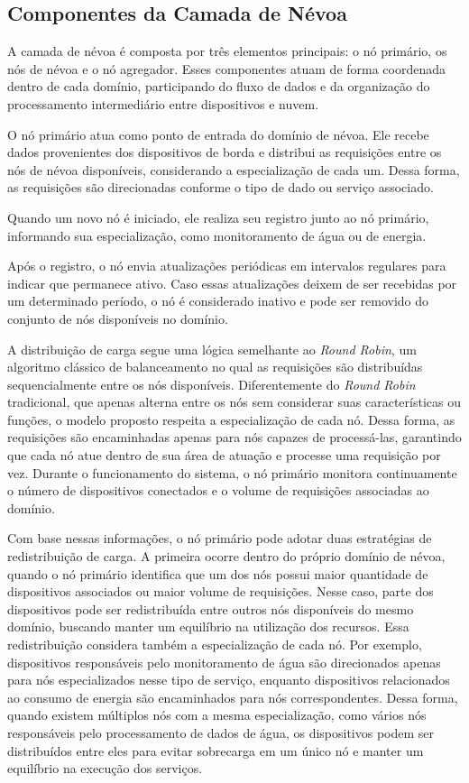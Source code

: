 \subsection{Componentes da Camada de Névoa}

A camada de névoa é composta por três elementos principais: o nó primário,
os nós de névoa e o nó agregador. Esses componentes atuam de forma
coordenada dentro de cada domínio, participando do fluxo de dados e da
organização do processamento intermediário entre dispositivos e nuvem.

O nó primário atua como ponto de entrada do domínio de névoa. Ele recebe
dados provenientes dos dispositivos de borda e distribui as requisições entre
os nós de névoa disponíveis, considerando a especialização de cada um.
Dessa forma, as requisições são direcionadas conforme o tipo de dado ou
serviço associado.

Quando um novo nó é iniciado, ele realiza seu registro junto ao nó primário, informando sua especialização, 
como monitoramento de água ou de energia.

Após o registro, o nó envia atualizações periódicas em intervalos regulares para indicar que permanece ativo. 
Caso essas atualizações deixem de ser recebidas por um determinado período, o nó é considerado 
inativo e pode ser removido do conjunto de nós disponíveis no domínio.

A distribuição de carga segue uma lógica semelhante ao \textit{Round Robin}, 
um algoritmo clássico de balanceamento no qual as requisições são distribuídas 
sequencialmente entre os nós disponíveis. Diferentemente do \textit{Round Robin} tradicional, 
que apenas alterna entre os nós sem considerar suas características ou funções, o modelo proposto 
respeita a especialização de cada nó. Dessa forma, as requisições são encaminhadas apenas para nós 
capazes de processá-las, garantindo que cada nó atue dentro de sua área de atuação e processe uma requisição por vez. 
Durante o funcionamento do sistema, o nó primário monitora continuamente o número de dispositivos conectados e o volume de 
requisições associadas ao domínio.

Com base nessas informações, o nó primário pode adotar duas estratégias de redistribuição de carga. A primeira ocorre dentro do próprio domínio de névoa, quando o nó primário identifica que um dos nós possui maior quantidade de dispositivos associados ou maior volume de requisições. Nesse caso, parte dos dispositivos pode ser redistribuída entre outros nós disponíveis do mesmo domínio, buscando manter um equilíbrio na utilização dos recursos. Essa redistribuição considera também a especialização de cada nó. Por exemplo, dispositivos responsáveis pelo monitoramento de água são direcionados apenas para nós especializados nesse tipo de serviço, enquanto dispositivos relacionados ao consumo de energia são encaminhados para nós correspondentes. Dessa forma, quando existem múltiplos nós com a mesma especialização, como vários nós responsáveis pelo processamento de dados de água, os dispositivos podem ser distribuídos entre eles para evitar sobrecarga em um único nó e manter um equilíbrio na execução dos serviços.

